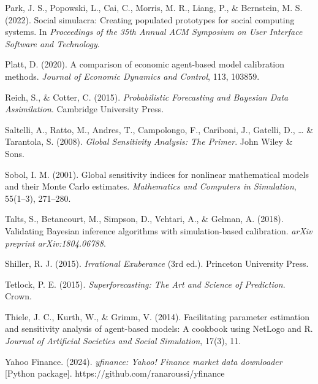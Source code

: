 \documentclass[
]{article}
\begin{document}
Park, J. S., Popowski, L., Cai, C., Morris, M. R., Liang, P., \&
Bernstein, M. S. (2022). Social simulacra: Creating populated prototypes
for social computing systems. In \emph{Proceedings of the 35th Annual
ACM Symposium on User Interface Software and Technology}.

Platt, D. (2020). A comparison of economic agent-based model calibration
methods. \emph{Journal of Economic Dynamics and Control}, 113, 103859.

Reich, S., \& Cotter, C. (2015). \emph{Probabilistic Forecasting and
Bayesian Data Assimilation}. Cambridge University Press.

Saltelli, A., Ratto, M., Andres, T., Campolongo, F., Cariboni, J.,
Gatelli, D., \ldots{} \& Tarantola, S. (2008). \emph{Global Sensitivity
Analysis: The Primer}. John Wiley \& Sons.

Sobol, I. M. (2001). Global sensitivity indices for nonlinear
mathematical models and their Monte Carlo estimates. \emph{Mathematics
and Computers in Simulation}, 55(1--3), 271--280.

Talts, S., Betancourt, M., Simpson, D., Vehtari, A., \& Gelman, A.
(2018). Validating Bayesian inference algorithms with simulation-based
calibration. \emph{arXiv preprint arXiv:1804.06788}.

Shiller, R. J. (2015). \emph{Irrational Exuberance} (3rd ed.). Princeton
University Press.

Tetlock, P. E. (2015). \emph{Superforecasting: The Art and Science of
Prediction}. Crown.

Thiele, J. C., Kurth, W., \& Grimm, V. (2014). Facilitating parameter
estimation and sensitivity analysis of agent-based models: A cookbook
using NetLogo and R. \emph{Journal of Artificial Societies and Social
Simulation}, 17(3), 11.

Yahoo Finance. (2024). \emph{yfinance: Yahoo! Finance market data
downloader} {[}Python package{]}. https://github.com/ranaroussi/yfinance
\end{document}
